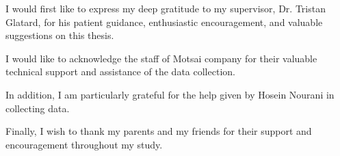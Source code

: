 \begin{acknowledgments}
I would first like to express my deep gratitude to my supervisor, Dr. Tristan
Glatard, for his patient guidance, enthusiastic encouragement, and valuable
suggestions on this thesis.
  
I would like to acknowledge the staff of Motsai company for their valuable
technical support and assistance of the data collection.
  
In addition, I am particularly grateful for the help given by Hosein Nourani in
collecting data.
  
Finally, I wish to thank my parents and my friends for their support and
encouragement throughout my study.
\end{acknowledgments}
